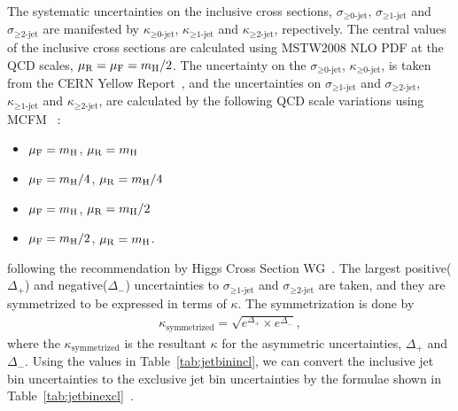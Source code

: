 The systematic uncertainties on the inclusive cross sections, 
$\sigma_{\ge\textrm{0-jet}}$, $\sigma_{\ge\textrm{1-jet}}$ and $\sigma_{\ge\textrm{2-jet}}$ are 
manifested by $\kappa_{\ge\textrm{0-jet}}$, $\kappa_{\ge\textrm{1-jet}}$ and $\kappa_{\ge\textrm{2-jet}}$, repectively.
The central values of the inclusive cross sections are calculated 
using MSTW2008 NLO PDF at the QCD scales, $\mu_\mathrm{R}=\mu_\mathrm{F}=m_{\mathrm{H}}/2$.
The uncertainty on the $\sigma_{\ge\textrm{0-jet}}$, $\kappa_{\ge\textrm{0-jet}}$, is taken from the 
CERN Yellow Report~\cite{Dittmaier:1318996}, and the uncertainties 
on $\sigma_{\ge\textrm{1-jet}}$ and $\sigma_{\ge\textrm{2-jet}}$, 
$\kappa_{\ge\textrm{1-jet}}$ and $\kappa_{\ge\textrm{2-jet}}$, are 
calculated by the following QCD scale variations using MCFM~\cite{Campbell:2010ff} : 
\begin{itemize}
\item $\mu_\mathrm{F} = m_{\mathrm{H}} $, $\mu_\mathrm{R} = m_{\mathrm{H}}$
\item $\mu_\mathrm{F} = m_{\mathrm{H}} / 4$, $\mu_\mathrm{R} = m_{\mathrm{H}} / 4$
\item $\mu_\mathrm{F} = m_{\mathrm{H}} $, $\mu_\mathrm{R} = m_{\mathrm{H}} / 2$
\item $\mu_\mathrm{F} = m_{\mathrm{H}} / 2$, $\mu_\mathrm{R}= m_{\mathrm{H}}$.
\end{itemize}
following the recommendation by Higgs Cross Section WG~\cite{Dittmaier:2012vm}. 
The largest positive($\Delta_{+}$) and negative($\Delta_{-}$) uncertainties 
to $\sigma_{\ge\textrm{1-jet}}$ and $\sigma_{\ge\textrm{2-jet}}$ are taken,
and they are symmetrized to be expressed in terms of $\kappa$. 
The symmetrization is done by 
\begin{eqnarray} 
  \kappa_{\mathrm{symmetrized}} = \sqrt{e^{\Delta_{+}} \times e^{\Delta_{-}}} ,
\end{eqnarray} 
where the $\kappa_{\mathrm{symmetrized}}$ is the resultant $\kappa$
for the asymmetric uncertainties, $\Delta_{+}$ and $\Delta_{-}$.
Using the values in Table~\ref{tab:jetbinincl}, we can convert the inclusive jet bin 
uncertainties to the exclusive jet bin uncertainties by the formulae shown in 
Table~\ref{tab:jetbinexcl}~\cite{Dittmaier:2012vm}.
